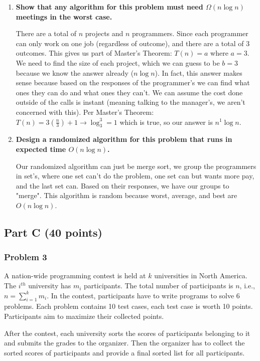 \documentclass[11pt]{article}
\begin{document}
\begin{enumerate}[label=\Alph*.]
\item \textbf{ Show that any algorithm for this problem must need $\Omega( n
\log{n} )$ meetings in the worst case.}

There are a total of $n$ projects and $n$ programmers. Since each programmer can only work on one job (regardless of outcome), and there are a total of $3$ outcomes. This gives us part of Master's Theorem: $T(n) = a$ where $a = 3$. We need to find the size of each project, which we can guess to be $b = 3$ because we know the answer already ($n \log n$). In fact, this answer makes sense because based on the responses of the programmer's we can find what ones they can do and what ones they can't. We can assume the cost done outside of the calls is instant (meaning talking to the manager's, we aren't concerned with this). Per Master's Theorem: $T(n) = 3(\frac{n}{3}) + 1 \to \log_3^3 = 1$ which is true, so our answer is $n^1 \log n$.

\item  \textbf{Design a randomized algorithm for this problem that runs in
expected time $O ( n \log{n} )$.}

Our randomized algorithm can just be merge sort, we group the programmers in set's, where one set can't do the problem, one set can but wants more pay, and the last set can. Based on their responses, we have our groups to "merge". This algorithm is random because worst, average, and best are $O(n \log n)$.
\end{enumerate}



\subsection*{Part C (40 points)}

\subsubsection*{Problem 3} 

A nation-wide programming contest is held
at $k$ universities in North America. The $i^{th}$ university has
$m_{i}$ participants. The total number of participants is $n$, i.e.,
$n = \sum_{i=1}^{k}m_{i}$. In the contest, participants have to write
programs to solve 6 problems. Each problem contains 10 test cases,
each test case is worth 10 points. Participants aim to maximize their
collected points.  

After the contest, each university sorts the scores of participants
belonging to it and submits the grades to the organizer.  Then the
organizer has to collect the sorted scores of participants and provide
a final sorted list for all participants.
\end{document}
